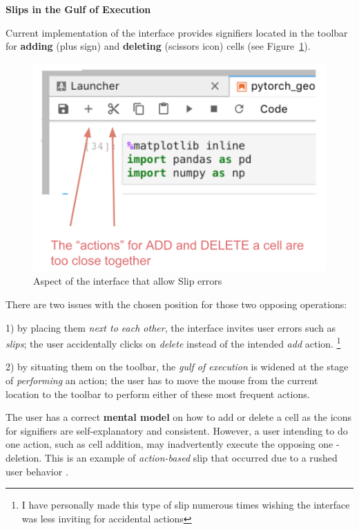 \documentclass[12pt,letterpaper]{article}
\begin{document}
\textbf{Slips in the Gulf of Execution} 

Current implementation of the interface provides signifiers located in the toolbar for \textbf{adding} (plus sign) and \textbf{deleting} (scissors icon) cells (see Figure~\ref{fig::2}). 

\begin{figure}[hbt!]
\centering
\includegraphics[scale=.4]{figures/project-principles/jupyter_add_delete.png}
\caption{Aspect of the interface that allow Slip errors}
\label{fig::2}
\end{figure}

There are two issues with the chosen position for those two opposing operations: 

1) by placing them \textit{next to each other}, the interface invites user errors such as \textit{slips}; the user accidentally clicks on \textit{delete} instead of the intended \textit{add} action. \footnote{I have personally made this type of slip numerous times wishing the interface was less inviting for accidental actions}  

2) by situating them on the toolbar, the \textit{gulf of execution} is widened at the stage of \textit{performing} an action; the user has to move the mouse from the current location to the toolbar to perform either of these most frequent actions.

The user has a correct \textbf{mental model} on how to add or delete a cell as the icons for signifiers are self-explanatory and consistent. However, a user intending to do one action, such as cell addition, may inadvertently execute the opposing one - deletion. This is an example of \textit{action-based} slip that occurred due to a rushed user behavior \cite{norman2013design}.
\end{document}
